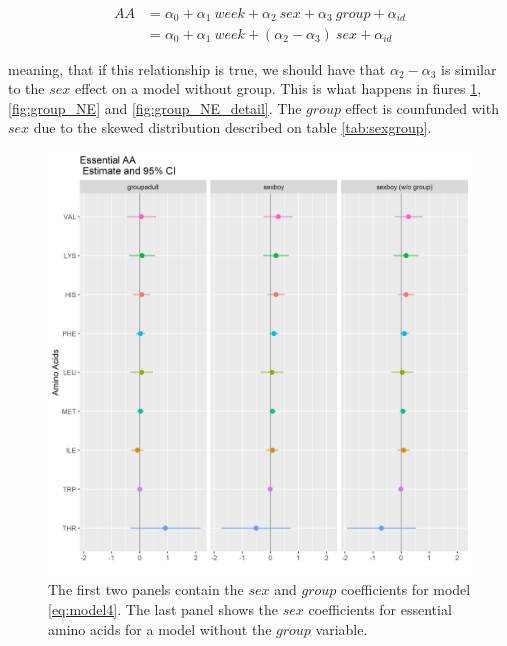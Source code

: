 \documentclass[12pt]{article}
\begin{document}
\begin{align}
AA &= \alpha_0 + \alpha_1 \ week + \alpha_2 \ sex + \alpha_3 \ group + \alpha_{id} \label{eq:model4} \\
   &= \alpha_0 + \alpha_1 \ week + \left(\alpha_2 - \alpha_3 \right) \ sex + \alpha_{id} \nonumber
\end{align}

meaning, that if this relationship is true, we should have that $\alpha_2 - \alpha_3$ is similar to the $sex$ effect on a model without group. This is what happens in fiures
\ref{fig:group_E}, \ref{fig:group_NE} and \ref{fig:group_NE_detail}. The $group$ effect is counfunded with $sex$ due to the skewed distribution described on table \ref{tab:sexgroup}.


\begin{figure}[!htb]
  \centering
  \includegraphics[width=\textwidth]{../wANDhc/group_E.png}
  \caption{The first two panels contain the $sex$ and $group$ coefficients for model \ref{eq:model4}. The last panel shows the $sex$ coefficients for essential amino acids for a model without the $group$ variable.}
  \label{fig:group_E}
\end{figure}
\end{document}
